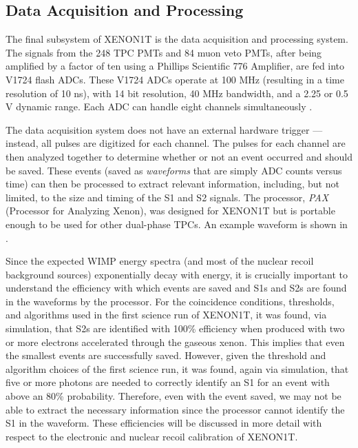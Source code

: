 \subsection{Data Acquisition and Processing}
\label{sec:xe1t_daq_pax}

The final subsystem of XENON1T is the data acquisition and processing system.  The signals from the 248 TPC PMTs and 84 muon veto PMTs, after being amplified by a factor of ten using a Phillips Scientific 776 Amplifier, are fed into V1724 flash ADCs.  These V1724 ADCs operate at 100 MHz (resulting in a time resolution of 10 ns), with 14 bit resolution, 40 MHz bandwidth, and a 2.25 or 0.5 V dynamic range.   Each ADC can handle eight channels simultaneously \cite{caen2017v1724}.  

The data acquisition system does not have an external hardware trigger --- instead, all pulses are digitized for each channel.  The pulses for each channel are then analyzed together to determine whether or not an event occurred and should be saved.  These events (saved as \textit{waveforms} that are simply ADC counts versus time) can then be processed to extract relevant information, including, but not limited, to the size and timing of the S1 and S2 signals.  The processor, \textit{PAX} (Processor for Analyzing Xenon), was designed for XENON1T but is portable enough to be used for other dual-phase TPCs.  An example waveform is shown in . %

Since the expected WIMP energy spectra (and most of the nuclear recoil background sources) exponentially decay with energy, it is crucially important to understand the efficiency with which events are saved and S1s and S2s are found in the waveforms by the processor.  For the coincidence conditions, thresholds, and algorithms used in the first science run of XENON1T, it was found, via simulation, that S2s are identified with 100\% efficiency when produced with two or more electrons accelerated through the gaseous xenon.  This implies that even the smallest events are successfully saved.  However, given the threshold and algorithm choices of the first science run, it was found, again via simulation, that five or more photons are needed to correctly identify an S1 for an event with above an 80\% probability.  Therefore, even with the event saved, we may not be able to extract the necessary information since the processor cannot identify the S1 in the waveform.  These efficiencies will be discussed in more detail with respect to the electronic and nuclear recoil calibration of XENON1T.

